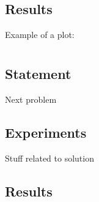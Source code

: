 \documentclass[12pt]{article}
\begin{document}
\subsection{Results}
Example of a plot:

\section{}
\subsection{Statement}
Next problem
\subsection{Experiments}
Stuff related to solution
\subsection{Results}
\end{document}
